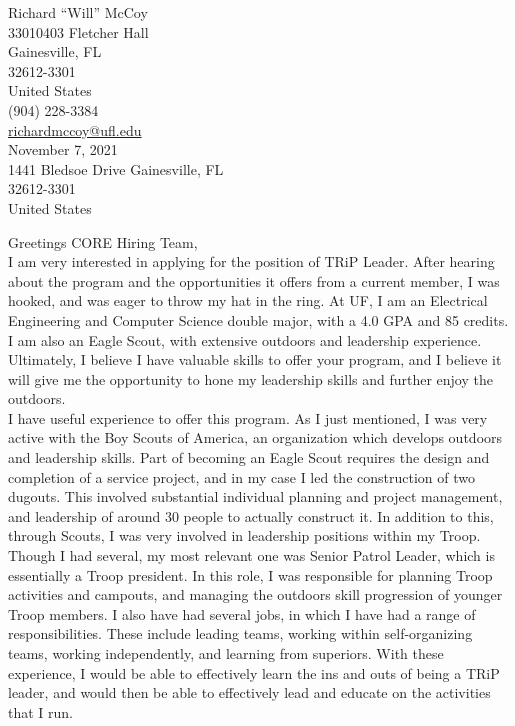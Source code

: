 \documentclass{article}
\begin{document}
Richard ``Will'' McCoy \\
33010403 Fletcher Hall \\
Gainesville, FL \\
32612-3301 \\
United States \\
(904) 228-3384 \\
\href{richardmccoy@ufl.edu}{richardmccoy@ufl.edu} \\

November 7, 2021 \\

1441 Bledsoe Drive
Gainesville, FL \\
32612-3301 \\
United States \\

\onehalfspacing

Greetings CORE Hiring Team, \\

I am very interested in applying for the position of TRiP Leader.
After hearing about the program and the opportunities it offers from a current member, I was hooked, and was eager to throw my hat in the ring.
At UF, I am an Electrical Engineering and Computer Science double major, with a 4.0 GPA and 85 credits.
I am also an Eagle Scout, with extensive outdoors and leadership experience.
Ultimately, I believe I have valuable skills to offer your program, and I believe it will give me the opportunity to hone my leadership skills and further enjoy the outdoors.
\\

I have useful experience to offer this program.
As I just mentioned, I was very active with the Boy Scouts of America, an organization which develops outdoors and leadership skills.
Part of becoming an Eagle Scout requires the design and completion of a service project, and in my case I led the construction of two dugouts.
This involved substantial individual planning and project management, and leadership of around 30 people to actually construct it.
In addition to this, through Scouts, I was very involved in leadership positions within my Troop.
Though I had several, my most relevant one was Senior Patrol Leader, which is essentially a Troop president.
In this role, I was responsible for planning Troop activities and campouts, and managing the outdoors skill progression of younger Troop members.
I also have had several jobs, in which I have had a range of responsibilities.
These include leading teams, working within self-organizing teams, working independently, and learning from superiors.
With these experience, I would be able to effectively learn the ins and outs of being a TRiP leader, and would then be able to effectively lead and educate on the activities that I run.
\\
\end{document}

